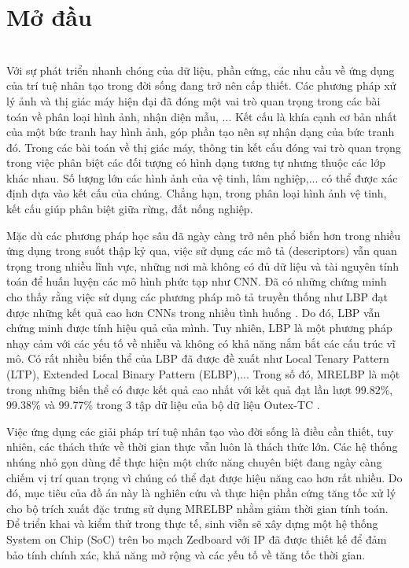 \clearpage
{}

\chapter*{Mở đầu}
\vspace{0.3cm}
 \\ Với sự phát triển nhanh chóng của dữ liệu, phần cứng, các nhu cầu về ứng dụng của trí tuệ nhân tạo trong đời sống đang trở nên cấp thiết. Các phương pháp xử lý ảnh và thị giác máy hiện đại đã đóng một vai trò quan trọng trong các bài toán về phân loại hình ảnh, nhận diện mẫu, ... Kết cấu là khía cạnh cơ bản nhất của một bức tranh hay hình ảnh, góp phần tạo nên sự nhận dạng của bức tranh đó. Trong các bài toán về thị giác máy, thông tin kết cấu đóng vai trò quan trọng trong việc phân biệt các đối tượng có hình dạng tương tự nhưng thuộc các lớp khác nhau. Số lượng lớn các hình ảnh của vệ tinh, lâm nghiệp,... có thể được xác định  dựa vào kết cấu của chúng. Chẳng hạn, trong phân loại hình ảnh vệ tinh, kết cấu giúp phân biệt giữa rừng, đất nống nghiệp. 


Mặc dù các phương pháp học sâu đã ngày càng trở nên phổ biến hơn trong nhiều ứng dụng trong suốt thập kỷ qua, việc sử dụng các mô tả (descriptors) vẫn quan trọng trong nhiều lĩnh vực, những nơi mà không có đủ dữ liệu và tài nguyên tính toán để huấn luyện các mô hình phức tạp như CNN. Đã có những chứng minh cho thấy rằng việc sử dụng các phương pháp mô tả truyền thống như LBP đạt được những kết quả cao hơn CNNs trong nhiều tình huống \cite{Liu2017}. Do đó, LBP vẫn chứng minh được tính hiệu quả của mình. Tuy nhiên, LBP là một phương pháp nhạy cảm với các yếu tố về nhiễu và không có khả năng nắm bắt các cấu trúc vĩ mô. Có rất nhiều biến thể của LBP đã được đề xuất như Local Tenary Pattern (LTP), Extended Local Binary Pattern (ELBP),... Trong số đó, MRELBP là một trong những biến thể có được kết quả cao nhất với kết quả đạt lần lượt 99.82\%, 99.38\% và 99.77\% trong 3 tập dữ liệu của bộ dữ liệu Outex-TC \cite{Liu2016}.   


Việc ứng dụng các giải pháp trí tuệ nhân tạo vào đời sống là điều cần thiết, tuy nhiên, các thách thức về thời gian thực vẫn luôn là thách thức lớn. Các hệ thống nhúng nhỏ gọn dùng để thực hiện một chức năng chuyên biệt đang ngày càng chiếm vị trí quan trọng vì chúng có thể đạt được hiệu năng cao hơn rất nhiều. Do đó, mục tiêu của đồ án này là nghiên cứu và thực hiện phần cứng tăng tốc xử lý cho bộ trích xuất đặc trưng sử dụng MRELBP nhằm giảm thời gian tính toán. Để triển khai và kiểm thử trong thực tế, sinh viễn sẽ xây dựng một hệ thống System on Chip (SoC) trên bo mạch Zedboard với IP đã được thiết kế để đảm bảo tính chính xác, khả năng mở rộng và các yếu tố về tăng tốc thời gian.
\vspace{0.3cm}


